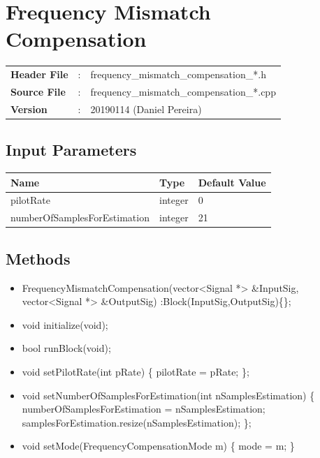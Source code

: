 \clearpage

\section{Frequency Mismatch Compensation}
\label{sec:frequency_mismatch_compensation}
\begin{refsection}

\begin{tcolorbox}	
\begin{tabular}{p{2.75cm} p{0.2cm} p{10.5cm}} 	
\textbf{Header File}    &:& frequency\_mismatch\_compensation\_*.h \\
\textbf{Source File}    &:& frequency\_mismatch\_compensation\_*.cpp \\
\textbf{Version}        &:& 20190114 (Daniel Pereira)
\end{tabular}
\end{tcolorbox}

\subsection*{Input Parameters}

\begin{table}[H]
\centering
\begin{tabular}{|l|l|l|}
\hline
Name                         & Type           & Default Value \\ \hline
pilotRate                    & integer        & 0             \\ \hline
numberOfSamplesForEstimation & integer        & 21            \\ \hline
\end{tabular}
\end{table}


\subsection*{Methods}

\begin{itemize}
  \item FrequencyMismatchCompensation(vector<Signal *> \&InputSig, vector<Signal *> \&OutputSig) :Block(InputSig,OutputSig)\{\};
  \item void initialize(void);
  \item bool runBlock(void);
  \item void setPilotRate(int pRate) \{ pilotRate = pRate; \};
  \item void setNumberOfSamplesForEstimation(int nSamplesEstimation) \{ numberOfSamplesForEstimation = nSamplesEstimation; samplesForEstimation.resize(nSamplesEstimation); \};
  \item void setMode(FrequencyCompensationMode m) \{  mode = m; \}
\end{itemize}





\end{refsection}
